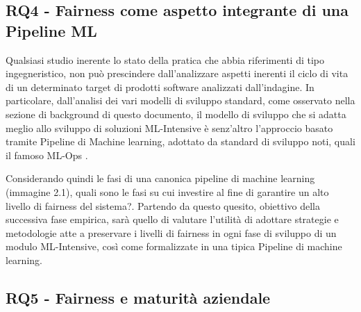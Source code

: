     
    \subsection{RQ4 - Fairness come aspetto integrante di una Pipeline ML}
    	\begin{center}
    	\hspace*{-5mm}%
    \end{center}
    
    Qualsiasi studio inerente lo stato della pratica che abbia riferimenti di tipo ingegneristico, non può prescindere dall'analizzare aspetti inerenti il ciclo di vita di un determinato target di prodotti software analizzati dall'indagine. In particolare, dall'analisi dei vari modelli di sviluppo standard, come osservato nella sezione di background di questo documento, il modello di sviluppo che si adatta meglio allo sviluppo di soluzioni ML-Intensive è senz'altro l'approccio basato tramite Pipeline di Machine learning, adottato da standard di sviluppo noti, quali il famoso ML-Ops \cite{MLOps}. 
    
    Considerando quindi le fasi di una canonica pipeline di machine learning (immagine 2.1), quali sono le fasi su cui investire al fine di garantire un alto livello di fairness del sistema?. Partendo da questo quesito, obiettivo della successiva fase empirica, sarà quello di valutare l'utilità di adottare strategie e metodologie atte a preservare i livelli di fairness in ogni fase di sviluppo di un modulo ML-Intensive, così come formalizzate in una tipica Pipeline di machine learning.   
    
    
    \subsection{RQ5 - Fairness e maturità aziendale}
    \begin{center}
    	\hspace*{-5mm}%
    \end{center}
      
